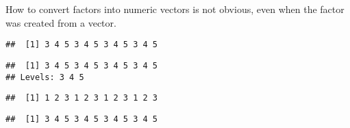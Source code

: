\documentclass[krantz2]{krantz}\usepackage{knitr}
\begin{document}
\begin{warningbox}
How to convert factors into numeric vectors is not obvious, even when the factor was created from a  vector.

\begin{knitrout}\footnotesize
{}\color{fgcolor}\begin{kframe}
\begin{alltt}
 \hlkwb{<-} \hlstd{(}\hlopt{:}\hlstd{,} \hlstd{)}
\end{alltt}
\begin{verbatim}
##  [1] 3 4 5 3 4 5 3 4 5 3 4 5
\end{verbatim}
\begin{alltt}
 \hlkwb{<-} 
\end{alltt}
\begin{verbatim}
##  [1] 3 4 5 3 4 5 3 4 5 3 4 5
## Levels: 3 4 5
\end{verbatim}
\begin{alltt}
\end{alltt}
\begin{verbatim}
##  [1] 1 2 3 1 2 3 1 2 3 1 2 3
\end{verbatim}
\begin{alltt}
\hlstd{(}
\end{alltt}
\begin{verbatim}
##  [1] 3 4 5 3 4 5 3 4 5 3 4 5
\end{verbatim}
\end{kframe}
\end{knitrout}
\end{warningbox}
\end{document}
